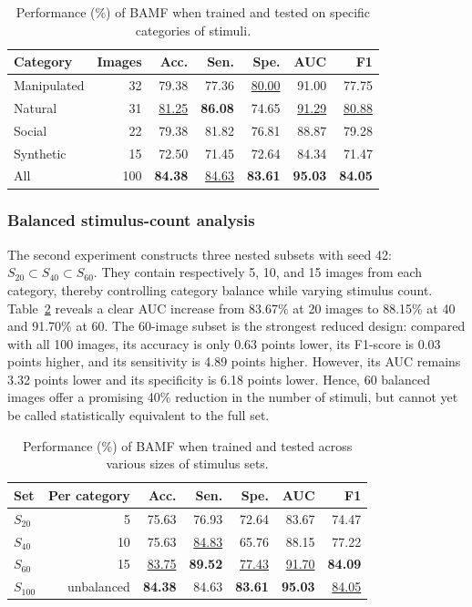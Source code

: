 \documentclass[conference,a4paper]{IEEEtran}
\begin{document}
\begin{table}[t]
\caption{Performance (\%) of BAMF when trained and tested on specific categories of stimuli.}
\label{tab:category_results}
\centering
\small
\setlength{\tabcolsep}{5.2pt}
\begin{tabular}{lrrrrrr}
\toprule
Category & Images & Acc. & Sen. & Spe. & AUC & F1 \\
\midrule
Manipulated & 32 & 79.38 & 77.36 & \underline{80.00} & 91.00 & 77.75 \\
Natural & 31 & \underline{81.25} & \textbf{86.08} & 74.65 & \underline{91.29} & \underline{80.88} \\
Social & 22 & 79.38 & 81.82 & 76.81 & 88.87 & 79.28 \\
Synthetic & 15 & 72.50 & 71.45 & 72.64 & 84.34 & 71.47 \\
All & 100 & \textbf{84.38} & \underline{84.63} & \textbf{83.61} & \textbf{95.03} & \textbf{84.05} \\
\bottomrule
\end{tabular}
\end{table}


\subsubsection{Balanced stimulus-count analysis}
The second experiment constructs three nested subsets with seed 42: $S_{20}\subset S_{40}\subset S_{60}$. They contain respectively 5, 10, and 15 images from each category, thereby controlling category balance while varying stimulus count. Table~\ref{tab:stimulus_count} reveals a clear AUC increase from 83.67\% at 20 images to 88.15\% at 40 and 91.70\% at 60. The 60-image subset is the strongest reduced design: compared with all 100 images, its accuracy is only 0.63 points lower, its F1-score is 0.03 points higher, and its sensitivity is 4.89 points higher. However, its AUC remains 3.32 points lower and its specificity is 6.18 points lower. Hence, 60 balanced images offer a promising 40\% reduction in the number of stimuli, but cannot yet be called statistically equivalent to the full set.

\begin{table}[t]
\caption{Performance (\%) of BAMF when trained and tested across various sizes of stimulus sets.}
\label{tab:stimulus_count}
\centering
\small
\setlength{\tabcolsep}{5.2pt}
\begin{tabular}{lrrrrrr}
\toprule
Set & Per category & Acc. & Sen. & Spe. & AUC & F1 \\
\midrule
$S_{20}$ & 5 & 75.63 & 76.93 & 72.64 & 83.67 & 74.47 \\
$S_{40}$ & 10 & 75.63 & \underline{84.83} & 65.76 & 88.15 & 77.22 \\
$S_{60}$ & 15 & \underline{83.75} & \textbf{89.52} & \underline{77.43} & \underline{91.70} & \textbf{84.09} \\
$S_{100}$ & unbalanced & \textbf{84.38} & 84.63 & \textbf{83.61} & \textbf{95.03} & \underline{84.05} \\
\bottomrule
\end{tabular}
\end{table}
\end{document}
